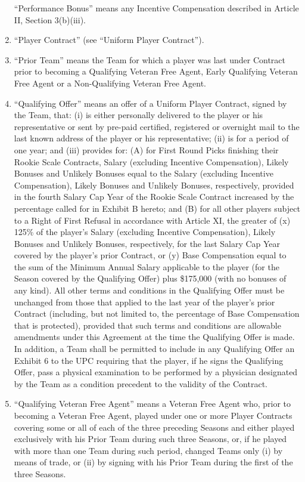 \documentclass[
]{book}
\begin{document}
\begin{enumerate}
  ``Performance Bonus'' means any Incentive Compensation described in Article II, Section 3(b)(iii).
\item
  ``Player Contract'' (see ``Uniform Player Contract'').
\item
  ``Prior Team'' means the Team for which a player was last under Contract prior to becoming a Qualifying Veteran Free Agent, Early Qualifying Veteran Free Agent or a Non-Qualifying Veteran Free Agent.
\item
  ``Qualifying Offer'' means an offer of a Uniform Player Contract, signed by the Team, that: (i) is either personally delivered to the player or his representative or sent by pre-paid certified, registered or overnight mail to the last known address of the player or his representative; (ii) is for a period of one year; and (iii) provides for: (A) for First Round Picks finishing their Rookie Scale Contracts, Salary (excluding Incentive Compensation), Likely Bonuses and Unlikely Bonuses equal to the Salary (excluding Incentive Compensation), Likely Bonuses and Unlikely Bonuses, respectively, provided in the fourth Salary Cap Year of the Rookie Scale Contract increased by the percentage called for in Exhibit B hereto; and (B) for all other players subject to a Right of First Refusal in accordance with Article XI, the greater of (x) 125\% of the player's Salary (excluding Incentive Compensation), Likely Bonuses and Unlikely Bonuses, respectively, for the last Salary Cap Year covered by the player's prior Contract, or (y) Base Compensation equal to the sum of the Minimum Annual Salary applicable to the player (for the Season covered by the Qualifying Offer) plus \$175,000 (with no bonuses of any kind). All other terms and conditions in the Qualifying Offer must be unchanged from those that applied to the last year of the player's prior Contract (including, but not limited to, the percentage of Base Compensation that is protected), provided that such terms and conditions are allowable amendments under this Agreement at the time the Qualifying Offer is made. In addition, a Team shall be permitted to include in any Qualifying Offer an Exhibit 6 to the UPC requiring that the player, if he signs the Qualifying Offer, pass a physical examination to be performed by a physician designated by the Team as a condition precedent to the validity of the Contract.
\item
  ``Qualifying Veteran Free Agent'' means a Veteran Free Agent who, prior to becoming a Veteran Free Agent, played under one or more Player Contracts covering some or all of each of the three preceding Seasons and either played exclusively with his Prior Team during such three Seasons, or, if he played with more than one Team during such period, changed Teams only (i) by means of trade, or (ii) by signing with his Prior Team during the first of the three Seasons.

\end{enumerate}
\end{document}
